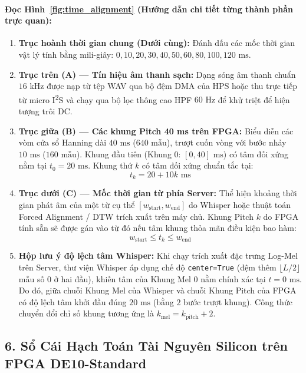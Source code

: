 \documentclass[11pt,a4paper]{article}
\begin{document}
\paragraph{Đọc Hình~\ref{fig:time_alignment} (Hướng dẫn chi tiết từng thành phần trực quan):}
\begin{enumerate}
    \setlength{\itemsep}{1.5pt}
    \item \textbf{Trục hoành thời gian chung (Dưới cùng):} Đánh dấu các mốc thời gian vật lý tính bằng mili-giây: $0, 10, 20, 30, 40, 50, 60, 80, 100, 120\text{ ms}$.
    \item \textbf{Trục trên (A) --- Tín hiệu âm thanh sạch:} Dạng sóng âm thanh chuẩn $16\text{ kHz}$ được nạp từ tệp WAV qua bộ đệm DMA của HPS hoặc thu trực tiếp từ micro I\textsuperscript{2}S và chạy qua bộ lọc thông cao HPF $60\text{ Hz}$ để khử triệt để hiện tượng trôi DC.
    \item \textbf{Trục giữa (B) --- Các khung Pitch 40 ms trên FPGA:} Biểu diễn các vòm cửa sổ Hanning dài $40\text{ ms}$ ($640\text{ mẫu}$), trượt cuốn vòng với bước nhảy $10\text{ ms}$ ($160\text{ mẫu}$). Khung đầu tiên (Khung 0: $[0, 40]\text{ ms}$) có tâm đối xứng nằm tại $t_0 = 20\text{ ms}$. Khung thứ $k$ có tâm đối xứng chuẩn tắc tại:
    \begin{equation}
    t_k = 20 + 10k\text{ ms}
    \end{equation}
    \item \textbf{Trục dưới (C) --- Mốc thời gian từ phía Server:} Thể hiện khoảng thời gian phát âm của một từ cụ thể $[w_{\text{start}}, w_{\text{end}}]$ do Whisper hoặc thuật toán Forced Alignment / DTW trích xuất trên máy chủ. Khung Pitch $k$ do FPGA tính sẵn sẽ được gán vào từ đó nếu tâm khung thỏa mãn điều kiện bao hàm:
    \begin{equation}
    w_{\text{start}} \le t_k \le w_{\text{end}}
    \end{equation}
    \item \textbf{Hộp lưu ý độ lệch tâm Whisper:} Khi chạy trích xuất đặc trưng Log-Mel trên Server, thư viện Whisper áp dụng chế độ \texttt{center=True} (đệm thêm $\lfloor L/2 \rfloor$ mẫu số 0 ở hai đầu), khiến tâm của Khung Mel 0 nằm chính xác tại $t = 0\text{ ms}$. Do đó, giữa chuỗi Khung Mel của Whisper và chuỗi Khung Pitch của FPGA có độ lệch tâm khởi đầu đúng $20\text{ ms}$ (bằng $2$ bước trượt khung). Công thức chuyển đổi chỉ số khung tương ứng là $k_{\text{mel}} = k_{\text{pitch}} + 2$.
\end{enumerate}

\subsection*{6. Sổ Cái Hạch Toán Tài Nguyên Silicon trên FPGA DE10-Standard}
\end{document}
